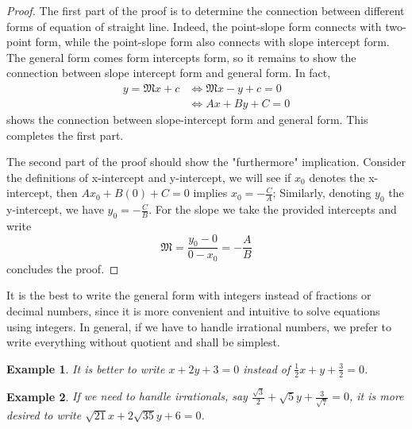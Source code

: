 \documentclass[12pt]{article}
\newtheorem*{example}{Example}
\begin{document}
    \begin{proof}
        The first part of the proof is to determine the connection between different forms of equation of straight line. Indeed, the point-slope form connects with two-point form, while the point-slope form also connects with slope intercept form. The general form comes form intercepts form, so it remains to show the connection between slope intercept form and general form. In fact, \begin{align*}
            y=\mathfrak{M}x+c &\iff \mathfrak{M}x-y+c=0\\
            &\iff Ax+By+C=0
        \end{align*}
        shows the connection between slope-intercept form and general form. This completes the first part.

        The second part of the proof should show the "furthermore" implication. Consider the definitions of x-intercept and y-intercept, we will see if $x_0$ denotes the x-intercept, then $Ax_0+B(0)+C=0$ implies $x_0=-\frac{C}{A}$; Similarly, denoting $y_0$ the y-intercept, we have $y_0=-\frac{C}{B}$. For the slope we take the provided intercepts and write $$\mathfrak{M}=\frac{y_0-0}{0-x_0}=-\frac{A}{B}$$ concludes the proof.
    \end{proof}

    It is the best to write the general form with integers instead of fractions or decimal numbers, since it is more convenient and intuitive to solve equations using integers. In general, if we have to handle irrational numbers, we prefer to write everything without quotient and shall be simplest.

    \begin{example}
        It is better to write $x+2y+3=0$ instead of $\frac{1}{2}x+y+\frac{3}{2}=0$.
    \end{example}

    \begin{example}
        If we need to handle irrationals, say $\frac{\sqrt{3}}{2}+\sqrt{5}y+\frac{3}{\sqrt{7}}=0$, it is more desired to write $\sqrt{21}x+2\sqrt{35}y+6=0$.
    \end{example}
\end{document}
